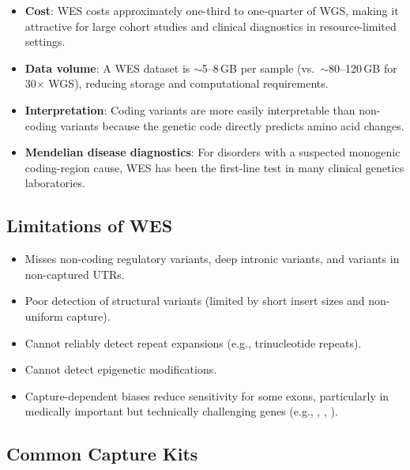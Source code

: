 \begin{itemize}[nosep]
  \item \textbf{Cost}: WES costs approximately one-third to one-quarter of WGS, making it attractive for large cohort studies and clinical diagnostics in resource-limited settings.
  \item \textbf{Data volume}: A WES dataset is $\sim$5--8\,GB per sample (vs.\ $\sim$80--120\,GB for 30$\times$ WGS), reducing storage and computational requirements.
  \item \textbf{Interpretation}: Coding variants are more easily interpretable than non-coding variants because the genetic code directly predicts amino acid changes.
  \item \textbf{Mendelian disease diagnostics}: For disorders with a suspected monogenic coding-region cause, WES has been the first-line test in many clinical genetics laboratories.
\end{itemize}

\subsection{Limitations of WES}

\begin{itemize}[nosep]
  \item Misses non-coding regulatory variants, deep intronic variants, and variants in non-captured UTRs.
  \item Poor detection of structural variants (limited by short insert sizes and non-uniform capture).
  \item Cannot reliably detect repeat expansions (e.g., trinucleotide repeats).
  \item Cannot detect epigenetic modifications.
  \item Capture-dependent biases reduce sensitivity for some exons, particularly in medically important but technically challenging genes (e.g., , , ).
\end{itemize}

\subsection{Common Capture Kits}

